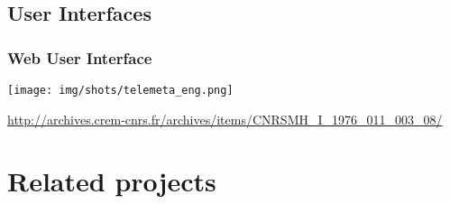 \documentclass[10pt, final, hyperref, table]{beamer}
\begin{document}
\subsection{User Interfaces}
\begin{frame}\frametitle{Web User Interface}
  \vspace{-0.25cm}
  \begin{center}
    \texttt{[image: img/shots/telemeta\_eng.png]}
  \end{center}
  \tiny{\url{http://archives.crem-cnrs.fr/archives/items/CNRSMH_I_1976_011_003_08/}}
\end{frame}


\section{Related projects}
\frame{\tableofcontents[currentsection]}
\end{document}
